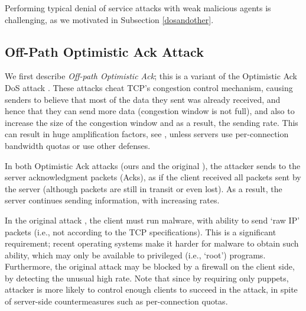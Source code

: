 \documentclass[conference]{IEEEtran}
\begin{document}
Performing typical denial of service attacks with weak malicious agents is challenging, as we motivated in Subsection \ref{dosandother}.

\subsection{Off-Path Optimistic Ack Attack} 
We first describe {\em Off-path Optimistic Ack}; this is a variant of the Optimistic Ack DoS attack  \cite{SBB05:OptAck}. These attacks cheat TCP's congestion control mechanism, causing senders to believe that most of the data they sent was already received, and hence that they can send more data (congestion window is not full), and also to increase the size of the congestion window and as a result, the sending rate. This can result in huge amplification factors, see \cite{SBB05:OptAck}, unless servers use per-connection bandwidth quotas or use other defenses. 

In both Optimistic Ack attacks (ours and the original \cite{SBB05:OptAck}), the attacker sends to the server acknowledgment packets (Acks), as if the client received all packets sent by the server (although packets are still in transit or even lost). As a result, the server continues sending information, with increasing rates. 

In the original attack \cite{SBB05:OptAck}, the client must run malware, with ability to send `raw IP' packets (i.e., not according to the TCP specifications). This is a significant requirement; recent operating systems make it harder for malware to obtain such ability, which may only be available to privileged (i.e., `root') programs. Furthermore, the original attack may be blocked by a firewall on the client side, by detecting the unusual high rate. Note that since by requiring only puppets, attacker is more likely to control enough clients to succeed in the attack, in spite of server-side countermeasures such as per-connection quotas. 
\end{document}
